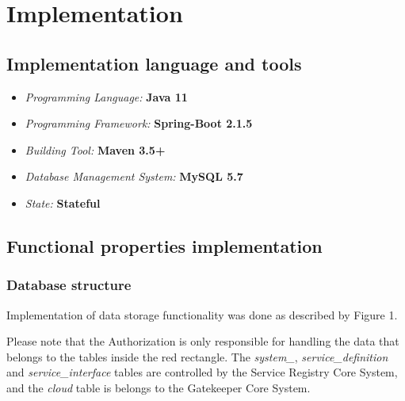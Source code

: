 \documentclass[a4paper]{arrowhead}
\begin{document}
\newpage

\section{Implementation}
\label{sec:implementation}

\subsection {Implementation language and tools}

\begin{itemize}
\item \emph{Programming Language:} \textbf{Java 11}
\item \emph{Programming Framework:} \textbf{Spring-Boot 2.1.5}
\item \emph{Building Tool:} \textbf{Maven 3.5+}
\item \emph{Database Management System:} \textbf{MySQL 5.7}
\item \emph{State:} \textbf{Stateful}
\end{itemize} 

\subsection {Functional properties implementation}

\subsubsection{Database structure}

Implementation of data storage functionality was done as described by Figure 1.

Please note that the Authorization is only responsible for handling the data that belongs to the tables inside the red rectangle. The \textit{system\_}, \textit{service\_definition} and \textit{service\_interface} tables are controlled by the Service Registry Core System, and the \textit{cloud} table is belongs to the Gatekeeper Core System.
\end{document}
